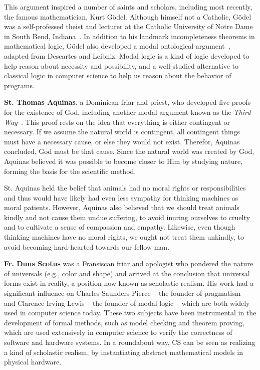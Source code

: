 \documentclass[sigplan,nonacm]{acmart}\settopmatter{printfolios=false,printccs=false,printacmref=false}
\begin{document}
This argument inspired a number of saints and scholars, including most recently, the famous mathematician, Kurt G\"odel. Although himself not a Catholic, G\"odel was a self-professed theist and lecturer at the Catholic University of Notre Dame in South Bend, Indiana~\cite{adzic2017logiclecturesgodelsbasic}. In addition to his landmark incompleteness theorems in mathematical logic, G\"odel also developed a modal ontological argument~\cite{wang1997logical}, adapted from Descartes and Leibniz. Modal logic is a kind of logic developed to help reason about necessity and possibility, and a well-studied alternative to classical logic in computer science to help us reason about the behavior of programs.

\textbf{St. Thomas Aquinas}, a Dominican friar and priest, who developed five proofs for the existence of God, including another modal argument known as the \textit{Third Way}~\cite{aquinas2008summa}. This proof rests on the idea that everything is either contingent or necessary. If we assume the natural world is contingent, all contingent things must have a necessary cause, or else they would not exist. Therefor, Aquinas concluded, God must be that cause. Since the natural world was created by God, Aquinas believed it was possible to become closer to Him by studying nature, forming the basis for the scientific method.

St. Aquinas held the belief that animals had no moral rights or responsibilities and thus would have likely had even less sympathy for thinking machines as moral patients. However, Aquinas also believed that we should treat animals kindly and not cause them undue suffering, to avoid inuring ourselves to cruelty and to cultivate a sense of compassion and empathy. Likewise, even though thinking machines have no moral rights, we ought not treat them unkindly, to avoid becoming hard-hearted towards our fellow man.

\textbf{Fr. Duns Scotus} was a Fransiscan friar and apologist who pondered the nature of universals (e.g., color and shape) and arrived at the conclusion that universal forms exist in reality, a position now known as scholastic realism. His work had a significant influence on Charles Saunders Pierce -- the founder of pragmatism -- and Clarence Irving Lewis -- the founder of modal logic -- which are both widely used in computer science today. These two subjects have been instrumental in the development of formal methods, such as model checking and theorem proving, which are used extensively in computer science to verify the correctness of software and hardware systems. In a roundabout way, CS can be seen as realizing a kind of scholastic realism, by instantiating abstract mathematical models in physical hardware.
\end{document}
